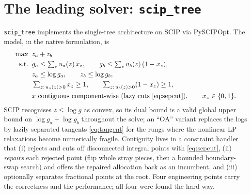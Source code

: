 \documentclass[11pt]{article}
\theoremstyle{definition}
\newcommand{\ga}{g_a}
\newcommand{\gb}{g_b}
\newcommand{\ua}{u_a}
\newcommand{\ub}{u_b}
\begin{document}
\section{The leading solver: \texttt{scip\_tree}}\label{sec:solver}

\texttt{scip\_tree} implements the single-tree architecture on SCIP via PySCIPOpt. The
model, in the native formulation, is
\begin{equation}\label{eq:native}
\begin{aligned}
\max\;\; & z_a + z_b\\
\text{s.t.}\;\;
& \ga \le \textstyle\sum_z \ua(z)\,x_z, \qquad
  \gb \le \textstyle\sum_z \ub(z)\,(1-x_z),\\
& z_a \le \log \ga, \qquad z_b \le \log \gb,\\
& \textstyle\sum_{z:\,\ua(z)>0} x_z \ge 1, \qquad \textstyle\sum_{z:\,\ub(z)>0}(1-x_z)\ge 1,\\
& x \text{ contiguous component-wise (lazy cuts \eqref{eq:sepcut})}, \qquad x_z\in\{0,1\}.
\end{aligned}
\end{equation}
SCIP recognises $z\le\log g$ as convex, so its dual bound is a valid global upper bound
on $\log\ga+\log\gb$ throughout the solve; an ``OA'' variant replaces the logs by lazily
separated tangents \eqref{eq:tangent} for the rungs where the nonlinear LP relaxations
become numerically fragile. Contiguity lives in a constraint handler that (i) rejects
and cuts off disconnected integral points with \eqref{eq:sepcut}, (ii) \emph{repairs}
each rejected point (flip whole stray pieces, then a bounded boundary-swap search) and
offers the repaired allocation back as an incumbent, and (iii) optionally separates
fractional points at the root. Four engineering points carry the correctness and the
performance; all four were found the hard way.
\end{document}
